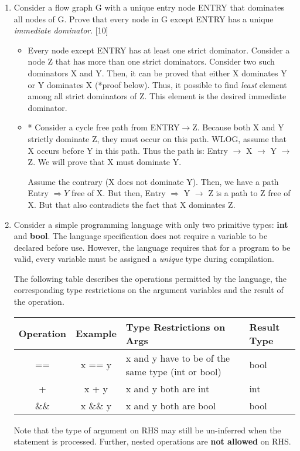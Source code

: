 \documentclass[12pt]{article}
\newcommand{\answer}[1]{{{\blue #1}}}
\begin{document}
\begin{enumerate}
\item Consider a flow graph G with a unique entry node ENTRY
  that dominates all nodes of G. Prove that every node in G
  except ENTRY has a unique {\em immediate dominator}. 
  \hfill[10]
\answer{
  \begin{itemize}
  \item Every node except ENTRY has at least one strict
    dominator. Consider a node Z that has more than one
    strict dominators. Consider two such dominators X and Y. Then,
    it can be proved that either X dominates Y or Y dominates
    X (*proof below). Thus, it possible to find {\em least} element among
    all strict dominators of Z. This element is the desired
    immediate dominator.
  \item * Consider a cycle free path from
    ENTRY$\rightarrow$Z. Because both X and Y strictly
    dominate Z, they must occur on this path. WLOG, assume
    that X occurs before Y in this path.  Thus the path is:
    Entry $\rightarrow$ X $\rightarrow$ Y $\rightarrow$ Z. We
    will prove that X must dominate Y.

    Assume the contrary (X does not dominate Y). Then, we
    have a path Entry $\Rightarrow Y$ free of X. But then,
    Entry $\Rightarrow$ Y $\rightarrow$ Z is a path to Z free
    of X. But that also contradicts the fact that X dominates
    Z.
  \end{itemize}
}
\clearpage

\item Consider a simple programming language with only two
  primitive types: {\bf int} and {\bf bool}. The language
  specification does not require a variable to be declared
  before use. However, the language requires that for a
  program to be valid, every variable must be assigned a {\em
    unique} type during compilation.

  The following table describes the operations permitted by
  the language, the corresponding type restrictions on the
  argument variables and the result of the operation.
  \begin{center}
    \begin{tabular}{|c|c|l|l|}\hline
      {\bf Operation} & {\bf Example} & {\bf Type Restrictions
        on Args} & {\bf Result Type} \\\hline\hline
      == & x == y & x and y have to be of the same type (int
      or bool) & bool \\\hline
      +  & x + y & x and y both are int & int \\\hline
      \&\& & x \&\& y &  x and y both are bool & bool \\\hline
    \end{tabular}
  \end{center}
  Note that the type of argument on RHS may still be
  un-inferred when the statement is processed. Further,
  nested operations are {\bf not allowed} on RHS.


\end{enumerate}
\end{document}
